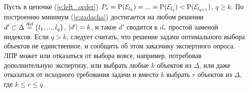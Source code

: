 Пусть в цепочке (\ref{e:left_order}) $P_* = {\mathrm{P}}(\mathcal{E}_{l_k}) = ... = {\mathrm{P}}(\mathcal{E}_{l_q}) < {\mathrm{P}}(\mathcal{E}_{l_{q+1}})$, $q \geq k$. По построению минимум (\ref{e:zadacha}) достигается на любом решении $d' \subset \Delta \overset{\text{def}}{=} \{l_1, ..., l_q\}$, $\left| d' \right| = k$, и такое $d'$ сводится к $d_*$ простой заменой индексов. Если $q > k$, следует считать, что решение задачи оптимального выбора объектов не единственное, и сообщить об этом заказчику экспертного опроса. ЛПР может или отказаться от выбора вовсе, например, потребовав дополнительную экспертизу, или выбрать любые $k$ объектов из $\Delta$, или даже отказаться от исходного требования задачи и вместо $k$ выбрать $r$ объектов из $\Delta$, где $k \leq r \leq q$.

